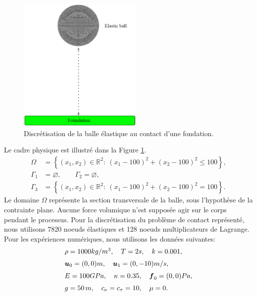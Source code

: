 \begin{figure}[!h]
	\begin{center}
		\includegraphics[width=6cm]{chapitres/chapitre_2/figures/ex_num.eps}
	\end{center}
	\caption{Discrétisation de la balle élastique au contact d'une fondation.}
	\label{fig_num1}
\end{figure}
Le cadre physique est illustré dans la Figure \ref{fig_num1}.
\begin{align*}
\Omega\, &=\left\{(x_1,x_2)\in \mathbb{R}^2:  \ (x_1-100)^2
+ (x_2-100)^2 \leq 100 \right\},\\
\Gamma_1&=  \varnothing, \qquad \Gamma_2=  \varnothing,\\
\Gamma_3&=\left\{(x_1,x_2)\in \mathbb{R}^2: \ (x_1-100)^2
+ (x_2-100)^2 = 100 \right\}.
\end{align*}
Le domaine $\Omega$ représente la section transversale de la balle, sous l'hypothèse de la contrainte plane. Aucune force volumique n'est supposée agir sur le corps pendant le processus. Pour la discrétisation du problème de contact représenté, nous utilisons 7820 noeuds élastiques et 128 noeuds multiplicateurs de Lagrange. Pour les expériences numériques, nous utilisons les données suivantes:
\begin{eqnarray}
\begin{array}{l}
\rho = 1000 kg/m^3, \quad T=2s,  \quad k=0.001, \nonumber \\[2mm]
\mbox{\boldmath{$u$}}_0=(0,0) m,  \quad \mbox{\boldmath{$u$}}_1=(0,-10) m/s, \nonumber \\[2mm]
E= 100 GPa,\quad \kappa=0.35, \quad \mbox{\boldmath{$f$}}_0=(0,0) Pa,  \nonumber \\[2mm]
g=50\,m, \quad c_{\nu} = c_{\tau} = 10, \quad \mu = 0. \nonumber
\end{array}
\end{eqnarray}

